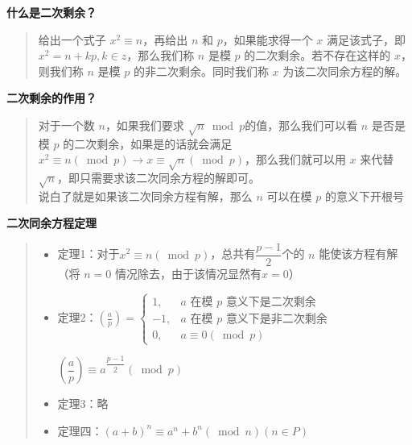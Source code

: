 \documentclass[E:/GsjzTle/main/main.tex]{subfiles}
\begin{document}
\textbf{什么是二次剩余？}

\begin{quote}
给出一个式子 \(x^2\equiv n\)，再给出 \(n\) 和 \(p\)，如果能求得一个
\(x\) 满足该式子，即 \(x^2 = n + kp,k∈z\)，那么我们称 \(n\) 是模 \(p\)
的二次剩余。若不存在这样的 \(x\)，则我们称 \(n\) 是模 \(p\)
的非二次剩余。同时我们称 \(x\) 为该二次同余方程的解。
\end{quote}

\textbf{二次剩余的作用？}

\begin{quote}
对于一个数 \(n\)，如果我们要求 \(\sqrt{n}\bmod p\)的值，那么我们可以看
\(n\) 是否是模 \(p\) 的二次剩余，如果是的话就会满足
\(x^2\equiv n(\bmod p)\rightarrow x\equiv \sqrt{n}(\bmod p)\)，那么我们就可以用
\(x\) 来代替 \(\sqrt{n}\)，即只需要求该二次同余方程的解即可。\\
说白了就是如果该二次同余方程有解，那么 \(n\) 可以在模 \(p\)
的意义下开根号
\end{quote}

\textbf{二次同余方程定理}

\begin{quote}
\begin{itemize}
\item
  定理1：对于\(x^2\equiv n(\bmod p)\)，总共有\(\dfrac{p-1}{2}\)个的
  \(n\) 能使该方程有解（将 \(n=0\) 情况除去，由于该情况显然有\(x=0\)）
\item
  定理2：\(\left(\frac{a}{p}\right)=\left\{\begin{array}{ll}
  1, & a \text { 在模 } p \text { 意义下是二次剩余 } \\
  -1, & a \text { 在模 } p \text { 意义下是非二次剩余 } \\
  0, & a \equiv 0(\bmod p)
  \end{array}\right.\)

  \((\dfrac{a}{p})\equiv a^{\dfrac{p-1}{2}}(\bmod p)\)
\item
  定理3：略
\item
  定理四：\((a+b)^{n} \equiv a^{n}+b^{n}(\bmod n)(n \in P)\)
\end{itemize}
\end{quote}
\end{document}
